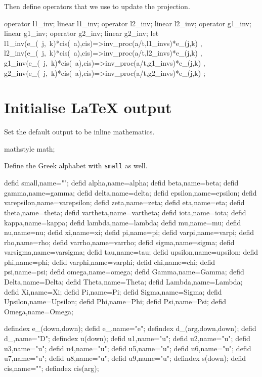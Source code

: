 \documentclass[11pt,a5paper]{article}
\def\cis\big(#1\big){\,e^{#1i}}
\def\eps{\varepsilon}
\begin{document}
Then define operators that we use to update the projection.
\begin{reduce}
operator l1_inv; linear l1_inv;
operator l2_inv; linear l2_inv;
operator g1_inv; linear g1_inv;
operator g2_inv; linear g2_inv;
let { l1_inv(e_(~j,~k)*cis(~a),cis)=>inv_proc(a/t,l1_invs)*e_(j,k)
    , l2_inv(e_(~j,~k)*cis(~a),cis)=>inv_proc(a/t,l2_invs)*e_(j,k)
    , g1_inv(e_(~j,~k)*cis(~a),cis)=>inv_proc(a/t,g1_invs)*e_(j,k)
    , g2_inv(e_(~j,~k)*cis(~a),cis)=>inv_proc(a/t,g2_invs)*e_(j,k)
    };
\end{reduce}









\section{Initialise LaTeX output}

Set the default output to be inline mathematics.
\begin{reduce}
mathstyle math;
\end{reduce}

Define the Greek alphabet with \verb|small| as well.
\begin{reduce}
defid small,name="\eps";%
defid alpha,name=alpha;
defid beta,name=beta;
defid gamma,name=gamma;
defid delta,name=delta;
defid epsilon,name=epsilon;
defid varepsilon,name=varepsilon;
defid zeta,name=zeta;
defid eta,name=eta;
defid theta,name=theta;
defid vartheta,name=vartheta;
defid iota,name=iota;
defid kappa,name=kappa;
defid lambda,name=lambda;
defid mu,name=mu;
defid nu,name=nu;
defid xi,name=xi;
defid pi,name=pi;
defid varpi,name=varpi;
defid rho,name=rho;
defid varrho,name=varrho;
defid sigma,name=sigma;
defid varsigma,name=varsigma;
defid tau,name=tau;
defid upsilon,name=upsilon;
defid phi,name=phi;
defid varphi,name=varphi;
defid chi,name=chi;
defid psi,name=psi;
defid omega,name=omega;
defid Gamma,name=Gamma;
defid Delta,name=Delta;
defid Theta,name=Theta;
defid Lambda,name=Lambda;
defid Xi,name=Xi;
defid Pi,name=Pi;
defid Sigma,name=Sigma;
defid Upsilon,name=Upsilon;
defid Phi,name=Phi;
defid Psi,name=Psi;
defid Omega,name=Omega;
\end{reduce}


\begin{reduce}
defindex e_(down,down);
defid e_,name="e";
defindex d_(arg,down,down);
defid d_,name="D";
defindex u(down);
defid u1,name="u"; 
defid u2,name="u"; 
defid u3,name="u"; 
defid u4,name="u"; 
defid u5,name="u"; 
defid u6,name="u"; 
defid u7,name="u"; 
defid u8,name="u"; 
defid u9,name="u"; 
defindex s(down);
defid cis,name="\cis";
defindex cis(arg);
\end{reduce}
\end{document}
